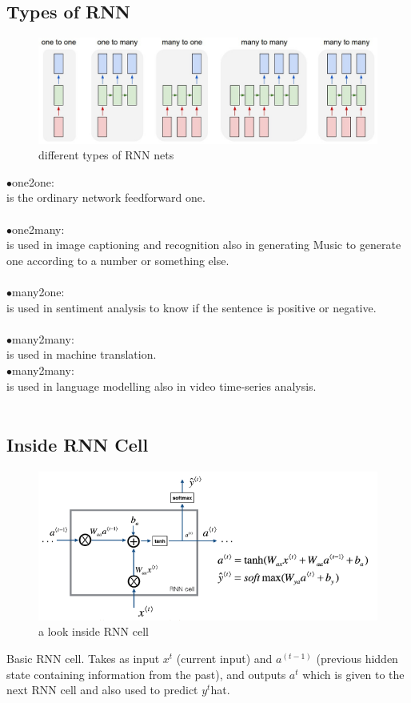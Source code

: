 \subsection{Types of RNN}
\begin{figure}[H]%
    \center%
    \includegraphics[width=\textwidth]{images/amir/diags.png}
    \caption[This is RNN types image]{different types of RNN nets}\label{fig:RNN types}%
  \end{figure}
\indent$\bullet$one2one:\\ is the ordinary network feedforward one.\\\\
\indent$\bullet$one2many:\\ is used in image captioning and recognition also in generating Music to generate one according to a number or something else.\\\\
\indent$\bullet$many2one:\\ is used in sentiment analysis to know if the sentence is positive or negative.\\\\
\indent$\bullet$many2many:\\ is used in machine translation.\\
\indent$\bullet$many2many:\\is used in language modelling also in video time-series analysis.\\\\
\subsection{Inside RNN Cell}
\begin{figure}[H]%
    \center%
    \includegraphics[width=\textwidth]{images/amir/Capture11.png}
    \caption[This is RNN inside image]{a look inside RNN cell}\label{fig:RNN inside}%
  \end{figure}
Basic RNN cell. Takes as input $x^t$ (current input) and $a^{(t-1)}$ (previous hidden state containing information from the past), and outputs $a^t$ which is 
given to the next RNN cell and also used to predict $y^t$hat.